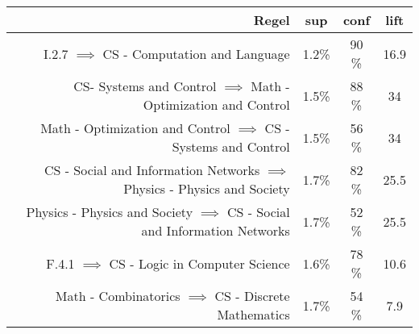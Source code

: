 	\begin{tabular}{rccc}
		\tiny \textbf{Regel} &\tiny \textbf{sup} &\tiny \textbf{conf} &\tiny \textbf{lift}\\
		\hline
		\tiny I.2.7 $\implies$ CS - Computation and Language &\tiny 1.2\% &\tiny 90 \% &\tiny 16.9 \\
		\tiny CS- Systems and Control $\implies$ Math - Optimization and Control &\tiny 1.5\% &\tiny 88 \% &\tiny 34 \\
		\tiny Math - Optimization and Control $\implies$ CS - Systems and Control  &\tiny 1.5\% &\tiny 56 \% &\tiny 34 \\
		\tiny CS - Social and Information Networks $\implies$ Physics - Physics and Society &\tiny 1.7\% &\tiny 82 \% &\tiny 25.5 \\
		\tiny Physics - Physics and Society $\implies$ CS - Social and Information Networks &\tiny 1.7\% &\tiny 52 \% &\tiny 25.5 \\
		\tiny F.4.1 $\implies$ CS - Logic in Computer Science &\tiny 1.6\% &\tiny 78 \% &\tiny 10.6 \\
		\tiny Math - Combinatorics $\implies$ CS - Discrete Mathematics  &\tiny 1.7\% &\tiny 54 \% &\tiny 7.9 \\
	\end{tabular}
